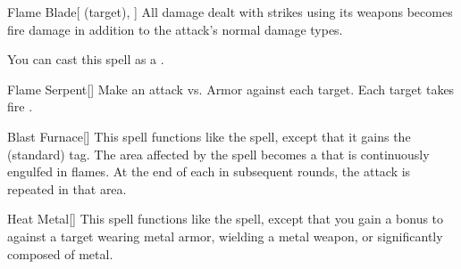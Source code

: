 \lowercase{\hypertarget{spell:Flame Blade}{}}\label{spell:Flame Blade}
\begin{attuneability}[\nth{2}]{\hypertarget{spell:Flame Blade}{Flame Blade}}[ (target), ]
All damage dealt with strikes using its weapons becomes fire damage in addition to the attack's normal damage types.

You can cast this spell as a .
\end{attuneability}
\vspace{0.25em}



\lowercase{\hypertarget{spell:Flame Serpent}{}}\label{spell:Flame Serpent}
\begin{freeability}[\nth{2}]{\hypertarget{spell:Flame Serpent}{Flame Serpent}}[]
Make an attack vs. Armor against each target.
\hit Each target takes fire .
\end{freeability}
\vspace{0.25em}



\lowercase{\hypertarget{spell:Blast Furnace}{}}\label{spell:Blast Furnace}
\begin{freeability}[\nth{3}]{\hypertarget{spell:Blast Furnace}{Blast Furnace}}[]
This spell functions like the  spell, except that it gains the  (standard) tag.
The area affected by the spell becomes a  that is continuously engulfed in flames.
At the end of each  in subsequent rounds, the attack is repeated in that area.
\end{freeability}
\vspace{0.25em}



\lowercase{\hypertarget{spell:Heat Metal}{}}\label{spell:Heat Metal}
\begin{freeability}[\nth{3}]{\hypertarget{spell:Heat Metal}{Heat Metal}}[]
This spell functions like the  spell, except that you gain a  bonus to  against a target wearing metal armor, wielding a metal weapon, or significantly composed of metal.
\end{freeability}
\vspace{0.25em}



